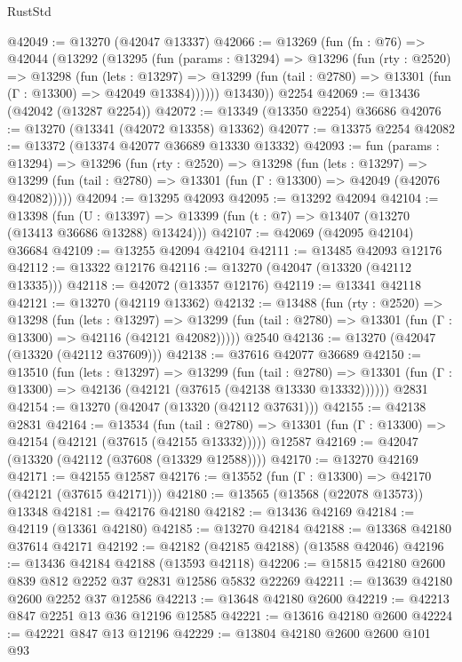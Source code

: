 \begin{lexlean}{RustStd}
\begin{coremodule}
@42049 := @13270 (@42047 @13337)
@42066 := @13269
    (fun (fn : @76) =>
    @42044
      (@13292
        (@13295
          (fun (params : @13294) =>
          @13296
            (fun (rty : @2520) =>
            @13298
              (fun (lets : @13297) =>
              @13299 (fun (tail : @2780) => @13301 (fun (Γ : @13300) => @42049 @13384))))))
        @13430))
    @2254
@42069 := @13436 (@42042 (@13287 @2254))
@42072 := @13349 (@13350 @2254) @36686
@42076 := @13270 (@13341 (@42072 @13358) @13362)
@42077 := @13375 @2254
@42082 := @13372 (@13374 @42077 @36689 @13330 @13332)
@42093 := fun (params : @13294) =>
  @13296
    (fun (rty : @2520) =>
    @13298
      (fun (lets : @13297) =>
      @13299 (fun (tail : @2780) => @13301 (fun (Γ : @13300) => @42049 (@42076 @42082)))))
@42094 := @13295 @42093
@42095 := @13292 @42094
@42104 := @13398
    (fun (U : @13397) => @13399 (fun (t : @7) => @13407 (@13270 (@13413 @36686 @13288) @13424)))
@42107 := @42069 (@42095 @42104) @36684
@42109 := @13255 @42094 @42104
@42111 := @13485 @42093 @12176
@42112 := @13322 @12176
@42116 := @13270 (@42047 (@13320 (@42112 @13335)))
@42118 := @42072 (@13357 @12176)
@42119 := @13341 @42118
@42121 := @13270 (@42119 @13362)
@42132 := @13488
    (fun (rty : @2520) =>
    @13298
      (fun (lets : @13297) =>
      @13299 (fun (tail : @2780) => @13301 (fun (Γ : @13300) => @42116 (@42121 @42082)))))
    @2540
@42136 := @13270 (@42047 (@13320 (@42112 @37609)))
@42138 := @37616 @42077 @36689
@42150 := @13510
    (fun (lets : @13297) =>
    @13299
      (fun (tail : @2780) =>
      @13301 (fun (Γ : @13300) => @42136 (@42121 (@37615 (@42138 @13330 @13332))))))
    @2831
@42154 := @13270 (@42047 (@13320 (@42112 @37631)))
@42155 := @42138 @2831
@42164 := @13534
    (fun (tail : @2780) => @13301 (fun (Γ : @13300) => @42154 (@42121 (@37615 (@42155 @13332)))))
    @12587
@42169 := @42047 (@13320 (@42112 (@37608 (@13329 @12588))))
@42170 := @13270 @42169
@42171 := @42155 @12587
@42176 := @13552 (fun (Γ : @13300) => @42170 (@42121 (@37615 @42171)))
@42180 := @13565 (@13568 (@22078 @13573)) @13348
@42181 := @42176 @42180
@42182 := @13436 @42169
@42184 := @42119 (@13361 @42180)
@42185 := @13270 @42184
@42188 := @13368 @42180 @37614 @42171
@42192 := @42182 (@42185 @42188) (@13588 @42046)
@42196 := @13436 @42184 @42188 (@13593 @42118)
@42206 := @15815 @42180 @2600 @839 @812 @2252 @37 @2831 @12586 @5832 @22269
@42211 := @13639 @42180 @2600 @2252 @37 @12586
@42213 := @13648 @42180 @2600
@42219 := @42213 @847 @2251 @13 @36 @12196 @12585
@42221 := @13616 @42180 @2600
@42224 := @42221 @847 @13 @12196
@42229 := @13804 @42180 @2600 @2600 @101 @93

\end{coremodule}
\end{lexlean}
